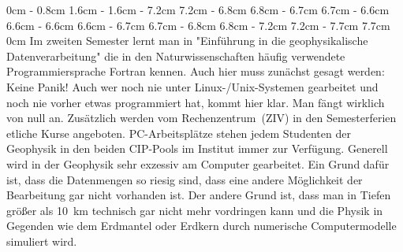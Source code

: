 \begin{multicols}{2}
{}
0cm \columnwidth
0cm \columnwidth
0cm \columnwidth
0cm \columnwidth
0cm \columnwidth
0cm \columnwidth
0cm \columnwidth
0cm \columnwidth
0.8cm \dimexpr\columnwidth - 0.8cm
1.6cm \dimexpr\columnwidth - 1.6cm
\dimexpr\columnwidth - 7.2cm 7.2cm
\dimexpr\columnwidth - 6.8cm 6.8cm
\dimexpr\columnwidth - 6.7cm 6.7cm
\dimexpr\columnwidth - 6.6cm 6.6cm
\dimexpr\columnwidth - 6.6cm 6.6cm
\dimexpr\columnwidth - 6.7cm 6.7cm
\dimexpr\columnwidth - 6.8cm 6.8cm
\dimexpr\columnwidth - 7.2cm 7.2cm
\dimexpr\columnwidth - 7.7cm 7.7cm
0cm \columnwidth
0cm \columnwidth
0cm \columnwidth
0cm \columnwidth
0cm \columnwidth
Im zweiten Semester lernt man in "Einführung in die geophysikalische Datenverarbeitung" die in den Naturwissenschaften häufig verwendete Programmiersprache Fortran kennen.
Auch hier muss zunächst gesagt werden: Keine Panik! Auch wer noch nie unter Linux-/Unix-Systemen gearbeitet und noch nie vorher etwas programmiert hat, kommt hier klar.
Man fängt wirklich von null an.
Zusätzlich werden vom Rechenzentrum~(ZIV) in den Semesterferien etliche Kurse angeboten.
PC-Arbeitsplätze stehen jedem Studenten der Geophysik in den beiden CIP-Pools im Institut immer zur Verfügung.
Generell wird in der Geophysik sehr exzessiv am Computer gearbeitet.
Ein Grund dafür ist, dass die Datenmengen so riesig sind, dass eine andere Möglichkeit der Bearbeitung gar nicht vorhanden ist.
Der andere Grund ist, dass man in Tiefen größer als \SI{10}{\km} technisch gar nicht mehr vordringen kann und die Physik in Gegenden wie dem Erdmantel oder Erdkern durch numerische Computermodelle simuliert wird.


\end{multicols}
